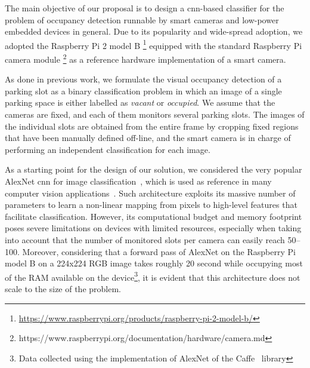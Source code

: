 \noindent The main objective of our proposal is to design a \gls{cnn}-based classifier for the problem of occupancy detection runnable by smart cameras and low-power embedded devices in general.
Due to its popularity and wide-spread adoption, we adopted the Raspberry Pi 2 model B \footnote{\url{https://www.raspberrypi.org/products/raspberry-pi-2-model-b/}} equipped with the standard Raspberry Pi camera module \footnote{{https://www.raspberrypi.org/documentation/hardware/camera.md}} as a reference hardware implementation of a smart camera.

As done in previous work, we formulate the visual occupancy detection of a parking slot as a binary classification problem in which an image of a single parking space is either labelled as \emph{vacant} or \emph{occupied}.
We assume that the cameras are fixed, and each of them monitors several parking slots.
The images of the individual slots are obtained from the entire frame by cropping fixed regions that have been manually defined off-line, and the smart camera is in charge of performing an independent classification for each image.

As a starting point for the design of our solution, we considered the very popular AlexNet \gls{cnn} for image classification~\cite{krizhevsky2012imagenet}, which is used as reference in many computer vision applications~\cite{}.
Such architecture exploits its massive number of parameters to learn a non-linear mapping from pixels to high-level features that facilitate classification.
However, its computational budget and memory footprint poses severe limitations on devices with limited resources,
especially when taking into account that the number of monitored slots per camera can easily reach 50--100.
Moreover, considering that a forward pass of AlexNet on the Raspberry Pi model B on a 224x224 RGB image takes roughly 20 second while occupying most of the RAM available on the device\footnote{Data collected using the implementation of AlexNet of the Caffe~\cite{jia2014caffe} library}, it is evident that this architecture does not scale to the size of the problem.

